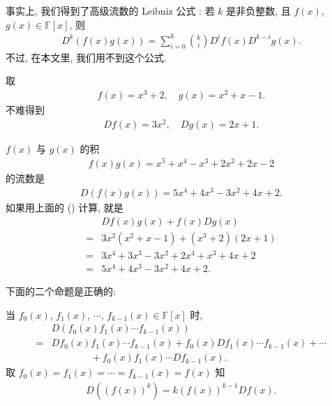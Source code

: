 \begin{remark}
    事实上, 我们得到了高级流数的 Leibniz 公式 : 若 $k$ 是非负整数, 且 $f(x)$, $g(x) \in \mathbb{F}[x]$, 则
    \begin{align*}
        D^k (f(x)g(x)) = \sum_{i = 0}^{k} \binom{k}{i} D^i f(x) D^{k-i} g(x).
    \end{align*}
    不过, 在本文里, 我们用不到这个公式.
\end{remark}

\begin{example}
    取
    \begin{align*}
        f(x) = x^3 + 2, \quad g(x) = x^2 + x - 1.
    \end{align*}
    不难得到
    \begin{align*}
        Df (x) = 3x^2, \quad Dg (x) = 2x + 1.
    \end{align*}

    $f(x)$ 与 $g(x)$ 的积
    \begin{align*}
        f(x) g(x) = x^5 + x^4 - x^3 + 2x^2 + 2x - 2
    \end{align*}
    的流数是
    \begin{align*}
        D(f(x) g(x)) = 5x^4 + 4x^3 - 3x^2 + 4x + 2.
    \end{align*}
    如果用上面的 () 计算, 就是
    \begin{align*}
             & Df (x) g(x) + f(x) Dg (x)                \\
        = {} & 3x^2 (x^2 + x - 1) + (x^3 + 2) (2x + 1)  \\
        = {} & 3x^4 + 3x^3 - 3x^2 + 2x^4 + x^3 + 4x + 2 \\
        = {} & 5x^4 + 4x^3 - 3x^2 + 4x + 2.
    \end{align*}
\end{example}

下面的二个命题是正确的:

\begin{proposition}
    当 $f_0 (x)$, $f_1 (x)$, $\cdots$, $f_{k-1} (x) \in \mathbb{F}[x]$ 时,
    \begin{align*}
             & D(f_0 (x) f_1 (x) \cdots f_{k-1} (x))                                              \\
        = {} & Df_0 (x) f_1 (x) \cdots f_{k-1} (x) + f_0 (x) Df_1 (x) \cdots f_{k-1} (x) + \cdots \\
             & \qquad \qquad + f_0 (x) f_1 (x) \cdots Df_{k-1} (x).
    \end{align*}
    取 $f_0 (x) = f_1 (x) = \cdots = f_{k-1} (x) = f(x)$ 知
    \begin{align*}
        D((f(x))^k) = k(f(x))^{k-1} Df(x).
    \end{align*}
\end{proposition}


